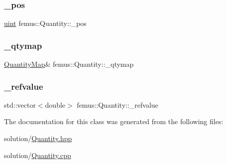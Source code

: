 \mbox{\label{classfemus_1_1_quantity_a5fde895b04b6561196673ecd2c9c0f42}} 
\subsubsection{\texorpdfstring{\+\_\+pos}{\_pos}}
{\footnotesize\ttfamily \mbox{\hyperlink{_typedefs_8hpp_a91ad9478d81a7aaf2593e8d9c3d06a14}{uint}} femus\+::\+Quantity\+::\+\_\+pos}

\mbox{\label{classfemus_1_1_quantity_a0298acf9a0633002493ec18fbd3ec612}} 
\subsubsection{\texorpdfstring{\+\_\+qtymap}{\_qtymap}}
{\footnotesize\ttfamily \mbox{\hyperlink{classfemus_1_1_quantity_map}{Quantity\+Map}}\& femus\+::\+Quantity\+::\+\_\+qtymap}

\mbox{\label{classfemus_1_1_quantity_ab3cbe19ad5d88005b2500d2841e6cc9e}} 
\subsubsection{\texorpdfstring{\+\_\+refvalue}{\_refvalue}}
{\footnotesize\ttfamily std\+::vector$<$double$>$ femus\+::\+Quantity\+::\+\_\+refvalue}



The documentation for this class was generated from the following files\+:\begin{DoxyCompactItemize}
\item 
solution/\mbox{\hyperlink{_quantity_8hpp}{Quantity.\+hpp}}\item 
solution/\mbox{\hyperlink{_quantity_8cpp}{Quantity.\+cpp}}\end{DoxyCompactItemize}
